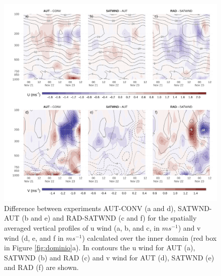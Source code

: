 \documentclass[final,5p,times,twocolumn,authoryear]{elsarticle} %
\begin{document}
\begin{figure}[th]

{\centering \includegraphics{../figures/UV-diff-1} 

}

\caption{Difference between experiments AUT-CONV (a and d), SATWND-AUT (b and e) and RAD-SATWND (c and f) for the spatially averaged vertical profiles of u wind (a, b, and c, in \(ms^{-1}\)) and v wind (d, e, and f in \(ms^{-1}\)) calculated over the inner domain (red box in Figure \ref{fig:dominio}a). In contours the u wind for AUT (a), SATWND (b) and RAD (c) and v wind for AUT (d), SATWND (e) and RAD (f) are shown.}\label{fig:UV-diff}
\end{figure}
\end{document}
